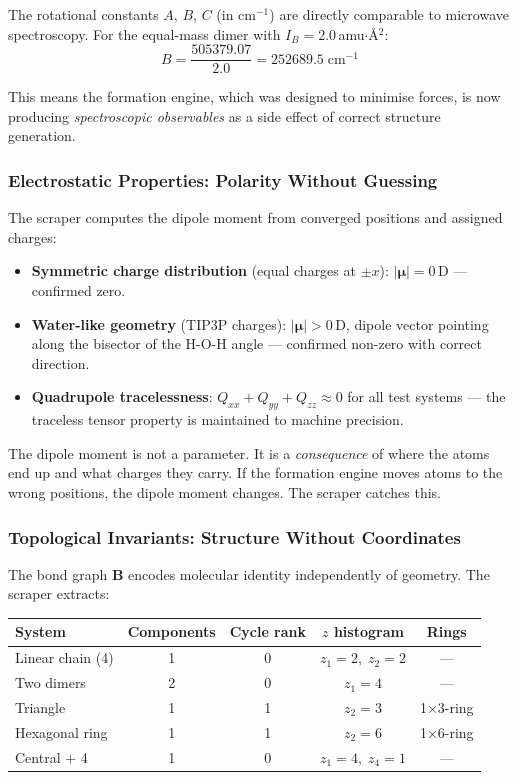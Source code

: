 \documentclass[11pt, a4paper, oneside]{article}
\theoremstyle{definition}
\theoremstyle{remark}
\begin{document}
The rotational constants $A$, $B$, $C$ (in cm$^{-1}$) are directly
comparable to microwave spectroscopy.  For the equal-mass dimer with
$I_B = 2.0$\,amu$\cdot$\AA$^2$:
\[
B = \frac{505379.07}{2.0} = 252689.5 \;\text{cm}^{-1}
\]

This means the formation engine, which was designed to minimise forces,
is now producing \textit{spectroscopic observables} as a side effect
of correct structure generation.

\subsubsection{Electrostatic Properties: Polarity Without Guessing}

The scraper computes the dipole moment from converged positions and
assigned charges:

\begin{itemize}
  \item \textbf{Symmetric charge distribution} (equal charges at
        $\pm x$): $|\bm{\mu}| = 0$\,D — confirmed zero.
  \item \textbf{Water-like geometry} (TIP3P charges): $|\bm{\mu}| > 0$\,D,
        dipole vector pointing along the bisector of the H-O-H angle —
        confirmed non-zero with correct direction.
  \item \textbf{Quadrupole tracelessness}: $Q_{xx} + Q_{yy} + Q_{zz} \approx 0$
        for all test systems — the traceless tensor property is
        maintained to machine precision.
\end{itemize}

The dipole moment is not a parameter.  It is a \textit{consequence} of
where the atoms end up and what charges they carry.  If the formation
engine moves atoms to the wrong positions, the dipole moment changes.
The scraper catches this.

\subsubsection{Topological Invariants: Structure Without Coordinates}

The bond graph $\mathbf{B}$ encodes molecular identity independently
of geometry.  The scraper extracts:

\begin{center}
\begin{tabular}{lcccc}
\toprule
System & Components & Cycle rank & $z$ histogram & Rings \\
\midrule
Linear chain (4) & 1 & 0 & $z_1{=}2,\; z_2{=}2$ & — \\
Two dimers & 2 & 0 & $z_1{=}4$ & — \\
Triangle & 1 & 1 & $z_2{=}3$ & 1$\times$3-ring \\
Hexagonal ring & 1 & 1 & $z_2{=}6$ & 1$\times$6-ring \\
Central $+$ 4 & 1 & 0 & $z_1{=}4,\; z_4{=}1$ & — \\
\bottomrule
\end{tabular}
\end{center}
\end{document}
